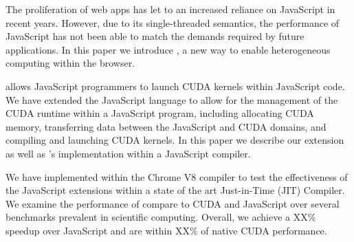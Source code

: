 
The proliferation of web apps has let to an increased reliance on JavaScript in
recent years. However, due to its single-threaded semantics, the performance of
JavaScript has not been able to match the demands required by future applications. In
this paper we introduce \name, a new way to enable heterogeneous computing
within the browser.

\name allows JavaScript programmers to launch CUDA kernels within JavaScript
code. We have extended the JavaScript language to allow for the management of
the CUDA runtime within a JavaScript program, including allocating CUDA memory,
transferring data between the JavaScript and CUDA domains, and compiling and
launching CUDA kernels. In this paper we describe our extension as well as
\name's
implementation within a JavaScript compiler.

We have implemented \name within the Chrome V8 compiler
to test the effectiveness of the JavaScript extensions within a state of the art
Just-in-Time (JIT) Compiler. We examine the performance of \name compare to CUDA
and JavaScript over several benchmarks prevalent in scientific computing.
Overall, we achieve a XX\% speedup over JavaScript and are within XX\% of native CUDA
performance.

